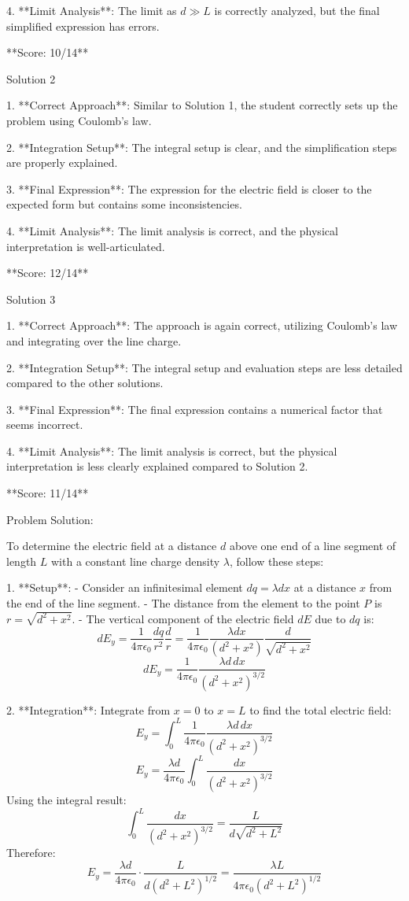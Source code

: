 \documentclass[a4paper,11pt]{article}
\begin{document}
4. **Limit Analysis**: The limit as \( d \gg L \) is correctly analyzed, but the final simplified expression has errors.

**Score: 10/14**

Solution 2

1. **Correct Approach**: Similar to Solution 1, the student correctly sets up the problem using Coulomb’s law.

2. **Integration Setup**: The integral setup is clear, and the simplification steps are properly explained.

3. **Final Expression**: The expression for the electric field is closer to the expected form but contains some inconsistencies.

4. **Limit Analysis**: The limit analysis is correct, and the physical interpretation is well-articulated.

**Score: 12/14**

Solution 3

1. **Correct Approach**: The approach is again correct, utilizing Coulomb’s law and integrating over the line charge.

2. **Integration Setup**: The integral setup and evaluation steps are less detailed compared to the other solutions.

3. **Final Expression**: The final expression contains a numerical factor that seems incorrect.

4. **Limit Analysis**: The limit analysis is correct, but the physical interpretation is less clearly explained compared to Solution 2.

**Score: 11/14**

Problem Solution:

To determine the electric field at a distance \( d \) above one end of a line segment of length \( L \) with a constant line charge density \( \lambda \), follow these steps:

1. **Setup**: 
    - Consider an infinitesimal element \( dq = \lambda dx \) at a distance \( x \) from the end of the line segment.
    - The distance from the element to the point \( P \) is \( r = \sqrt{d^2 + x^2} \).
    - The vertical component of the electric field \( dE \) due to \( dq \) is:
      \[
      dE_y = \frac{1}{4\pi\epsilon_0} \frac{dq}{r^2} \frac{d}{r} = \frac{1}{4\pi\epsilon_0} \frac{\lambda dx}{(d^2 + x^2)} \frac{d}{\sqrt{d^2 + x^2}}
      \]
      \[
      dE_y = \frac{1}{4\pi\epsilon_0} \frac{\lambda d\, dx}{(d^2 + x^2)^{3/2}}
      \]

2. **Integration**: Integrate from \( x = 0 \) to \( x = L \) to find the total electric field:
    \[
    E_y = \int_0^L \frac{1}{4\pi\epsilon_0} \frac{\lambda d\, dx}{(d^2 + x^2)^{3/2}}
    \]
    \[
    E_y = \frac{\lambda d}{4\pi\epsilon_0} \int_0^L \frac{dx}{(d^2 + x^2)^{3/2}}
    \]
    Using the integral result:
    \[
    \int_0^L \frac{dx}{(d^2 + x^2)^{3/2}} = \frac{L}{d\sqrt{d^2 + L^2}}
    \]
    Therefore:
    \[
    E_y = \frac{\lambda d}{4\pi\epsilon_0} \cdot \frac{L}{d (d^2 + L^2)^{1/2}} = \frac{\lambda L}{4\pi\epsilon_0 (d^2 + L^2)^{1/2}}
    \]
\end{document}
